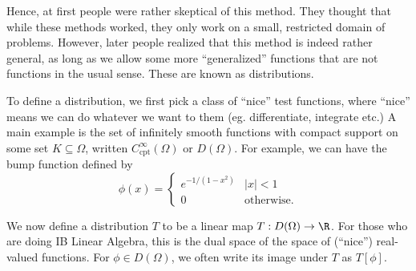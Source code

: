 \documentclass[a4paper]{article}
\begin{document}
Hence, at first people were rather skeptical of this method. They thought that while these methods worked, they only work on a small, restricted domain of problems. However, later people realized that this method is indeed rather general, as long as we allow some more ``generalized'' functions that are not functions in the usual sense. These are known as distributions.

To define a distribution, we first pick a class of ``nice'' test functions, where ``nice'' means we can do whatever we want to them (eg. differentiate, integrate etc.) A main example is the set of infinitely smooth functions with compact support on some set $K\subseteq \Omega$, written $C^{\infty}_{\mathrm{cpt}}(\Omega)$ or $D(\Omega)$. For example, we can have the bump function defined by
\[
  \phi(x) =
  \begin{cases}
    e^{-1/(1- x^2)} & |x| < 1\\
    0 & \text{otherwise}.
  \end{cases}
\]
\begin{center}
\end{center}
We now define a distribution $T$ to be a linear map $T:D(\Omega) \to \R$. For those who are doing IB Linear Algebra, this is the dual space of the space of (``nice'') real-valued functions. For $\phi \in D(\Omega)$, we often write its image under $T$ as $T[\phi]$.
\end{document}
